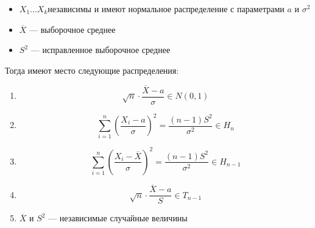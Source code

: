 \begin{theorem}[основная]\itemfix
    \begin{itemize}
        \item \(X_1 \dots X_k \)независимы и имеют нормальное распределение с параметрами \(a\) и \(\sigma^2\)
        \item \(\overline{X}\) --- выборочное среднее
        \item \(S^2\) --- исправленное выборочное среднее
    \end{itemize}

    Тогда имеют место следующие распределения:
    \begin{enumerate}
        \item \[\sqrt{n} \cdot \frac{\overline{X} - a}{\sigma} \in N(0, 1)\]
        \item \[\sum_{i=1}^{n} \left(\frac{X_i - a}{\sigma}\right)^2 = \frac{(n - 1) S^2}{\sigma^2} \in H_n\]
        \item \[\sum_{i=1}^{n} \left(\frac{X_i - \overline{X}}{\sigma}\right)^2 = \frac{(n - 1)S^2}{\sigma^2} \in H_{n-1}\]
        \item \[\sqrt{n} \cdot \frac{\overline{X} - a}{S} \in T_{n-1}\]
        \item \(\overline{X}\) и \(S^2\) --- независимые случайные величины
    \end{enumerate}
\end{theorem}
